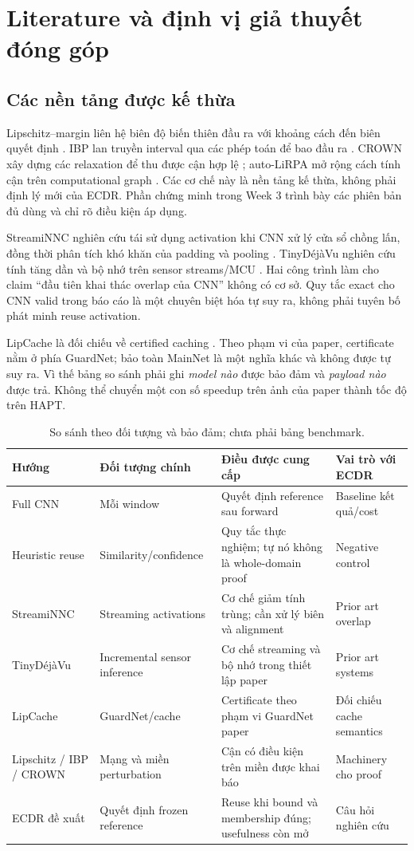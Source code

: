 \documentclass[11pt,a4paper]{article}
\theoremstyle{remark}
\begin{document}
\section{Literature và định vị giả thuyết đóng góp}
\subsection{Các nền tảng được kế thừa}
Lipschitz--margin liên hệ biên độ biến thiên đầu ra với khoảng cách đến
biên quyết định \cite{lmt}. IBP lan truyền interval qua các phép toán để
bao đầu ra \cite{ibp}. CROWN xây dựng các relaxation để thu được cận hợp lệ
\cite{crown}; auto-LiRPA mở rộng cách tính cận trên computational graph
\cite{lirpa}. Các cơ chế này là nền tảng kế thừa, không phải định lý mới của
ECDR. Phần chứng minh trong Week 3 trình bày các phiên bản đủ dùng và chỉ rõ
điều kiện áp dụng.

StreamiNNC nghiên cứu tái sử dụng activation khi CNN xử lý cửa sổ chồng
lấn, đồng thời phân tích khó khăn của padding và pooling \cite{streaminnc}.
TinyD\'ej\`aVu nghiên cứu tính tăng dần và bộ nhớ trên sensor streams/MCU
\cite{tiny}. Hai công trình làm cho claim ``đầu tiên khai thác overlap của
CNN'' không có cơ sở. Quy tắc exact cho CNN valid trong báo cáo là một
chuyên biệt hóa tự suy ra, không phải tuyên bố phát minh reuse activation.

LipCache là đối chiếu về certified caching \cite{lipcache}. Theo phạm vi
của paper, certificate nằm ở phía GuardNet; bảo toàn MainNet là một nghĩa
khác và không được tự suy ra. Vì thế bảng so sánh phải ghi \emph{model nào}
được bảo đảm và \emph{payload nào} được trả. Không thể chuyển một con số
speedup trên ảnh của paper thành tốc độ trên HAPT.

\begin{table}[htbp]\centering\small
\caption{So sánh theo đối tượng và bảo đảm; chưa phải bảng benchmark.}
\begin{tabularx}{\linewidth}{@{}p{2.25cm}YYY@{}}\toprule
Hướng & Đối tượng chính & Điều được cung cấp & Vai trò với ECDR\\\midrule
Full CNN & Mỗi window & Quyết định reference sau forward & Baseline kết quả/cost\\
Heuristic reuse & Similarity/confidence & Quy tắc thực nghiệm; tự nó không là
whole-domain proof & Negative control\\
StreamiNNC & Streaming activations & Cơ chế giảm tính trùng; cần xử lý biên
và alignment & Prior art overlap\\
TinyD\'ej\`aVu & Incremental sensor inference & Cơ chế streaming và bộ nhớ
trong thiết lập paper & Prior art systems\\
LipCache & GuardNet/cache & Certificate theo phạm vi GuardNet paper & Đối
chiếu cache semantics\\
Lipschitz / IBP / CROWN & Mạng và miền perturbation & Cận có điều kiện trên miền
được khai báo & Machinery cho proof\\
ECDR đề xuất & Quyết định frozen reference & Reuse khi bound và membership
đúng; usefulness còn mở & Câu hỏi nghiên cứu\\\bottomrule
\end{tabularx}
\end{table}
\end{document}
